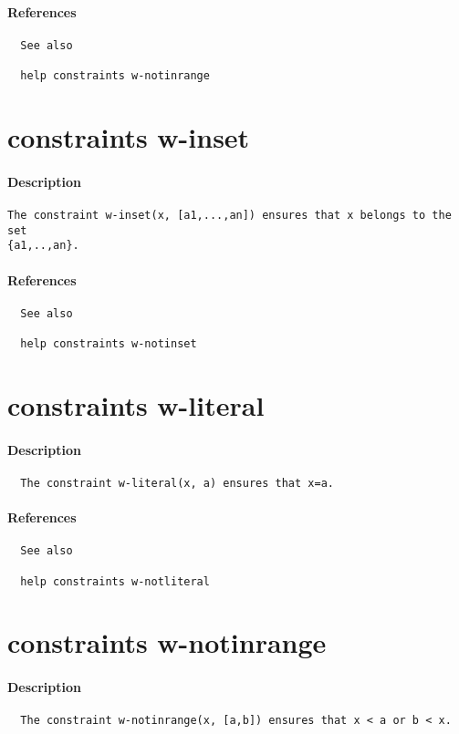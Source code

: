 \paragraph{References}
{\footnotesize
\begin{verbatim}
  See also

  help constraints w-notinrange
\end{verbatim}
}
\section{constraints w-inset}
\paragraph{Description}
{\footnotesize
\begin{verbatim}
The constraint w-inset(x, [a1,...,an]) ensures that x belongs to the set
{a1,..,an}.
\end{verbatim}
}
\paragraph{References}
{\footnotesize
\begin{verbatim}
  See also

  help constraints w-notinset
\end{verbatim}
}
\section{constraints w-literal}
\paragraph{Description}
{\footnotesize
\begin{verbatim}
  The constraint w-literal(x, a) ensures that x=a.
\end{verbatim}
}
\paragraph{References}
{\footnotesize
\begin{verbatim}
  See also

  help constraints w-notliteral
\end{verbatim}
}
\section{constraints w-notinrange}
\paragraph{Description}
{\footnotesize
\begin{verbatim}
  The constraint w-notinrange(x, [a,b]) ensures that x < a or b < x.
\end{verbatim}
}
